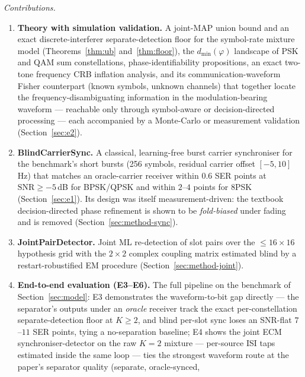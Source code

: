 \documentclass[journal]{IEEEtran}
\newcommand{\snr}{\mathrm{SNR}}
\begin{document}
\emph{Contributions.}
\begin{enumerate}
  \item \textbf{Theory with simulation validation.} A joint-MAP union
        bound and an exact discrete-interferer separate-detection floor
        for the symbol-rate mixture model (Theorems~\ref{thm:ub}
        and~\ref{thm:floor}), the $d_{\min}(\varphi)$ landscape of PSK
        and QAM sum constellations, phase-identifiability propositions,
        an exact two-tone frequency CRB inflation analysis, and its
        communication-waveform Fisher counterpart (known symbols,
        unknown channels) that together locate the
        frequency-disambiguating information in the modulation-bearing
        waveform --- reachable only through symbol-aware or
        decision-directed processing --- each accompanied by a
        Monte-Carlo or measurement
        validation (Section~\ref{sec:e2}).
  \item \textbf{BlindCarrierSync.} A classical, learning-free burst
        carrier synchroniser for the benchmark's short bursts (256
        symbols, residual carrier offset $[-5, 10]$\,Hz) that matches an
        oracle-carrier receiver within $0.6$ SER points at
        $\snr \geq -5$\,dB for BPSK/QPSK and within $2$--$4$ points for
        8PSK (Section~\ref{sec:e1}). Its
        design was itself measurement-driven: the textbook
        decision-directed phase refinement is shown to be
        \emph{fold-biased} under fading and is removed
        (Section~\ref{sec:method-sync}).
  \item \textbf{JointPairDetector.} Joint ML re-detection of slot pairs
        over the $\leq 16 \times 16$ hypothesis grid with the $2 \times 2$
        complex coupling matrix estimated blind by a
        restart-robustified EM procedure (Section~\ref{sec:method-joint}).
  \item \textbf{End-to-end evaluation (E3--E6).} The full pipeline on
        the benchmark of Section~\ref{sec:model}: E3 demonstrates the
        waveform-to-bit gap directly --- the separator's outputs under
        an \emph{oracle} receiver track the exact per-constellation
        separate-detection floor at $K \geq 2$, and blind per-slot sync loses an SNR-flat
        $7$--$11$ SER points, tying a no-separation baseline; E4 shows
        the joint ECM synchroniser-detector on the
        raw $K{=}2$ mixture --- per-source ISI taps estimated inside
        the same loop --- ties the
        strongest waveform route at the paper's separator quality
        (separate, oracle-synced,

\end{enumerate}
\end{document}
